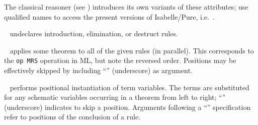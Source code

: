 \begin{isabellebody}
\begin{isamarkuptext}
\begin{description}
  The classical reasoner (see ) introduces its
  own variants of these attributes; use qualified names to access the
  present versions of Isabelle/Pure, i.e.\ \hyperlink{attribute.Pure.Pure.intro}{\mbox{}}.
  
  \item \hyperlink{attribute.Pure.rule}{\mbox{}}~ undeclares introduction,
  elimination, or destruct rules.
  
  \item \hyperlink{attribute.OF}{\mbox{}}~ applies some
  theorem to all of the given rules 
  (in parallel).  This corresponds to the \verb|op MRS| operation in
  ML, but note the reversed order.  Positions may be effectively
  skipped by including ``'' (underscore) as argument.
  
  \item \hyperlink{attribute.of}{\mbox{}}~ performs positional
  instantiation of term variables.  The terms  are
  substituted for any schematic variables occurring in a theorem from
  left to right; ``'' (underscore) indicates to skip a
  position.  Arguments following a ``'' specification
  refer to positions of the conclusion of a rule.
  

\end{description}
\end{isamarkuptext}
\end{isabellebody}
